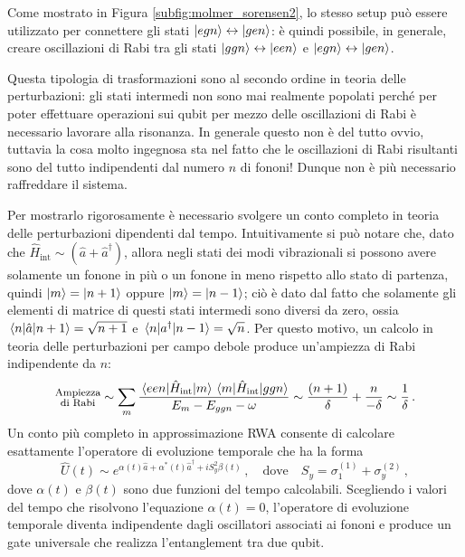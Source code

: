 \noindent Come mostrato in Figura \ref{subfig:molmer_sorensen2}, lo stesso setup può essere utilizzato per connettere gli stati $\ket{egn} \leftrightarrow \ket{gen}$: è quindi possibile, in generale, creare oscillazioni di Rabi tra gli stati $\ket{ggn} \leftrightarrow \ket{een}$ e $\ket{egn} \leftrightarrow \ket{gen}$. 

\noindent Questa tipologia di trasformazioni sono al secondo ordine in teoria delle perturbazioni: gli stati intermedi non sono mai realmente popolati perché per poter effettuare operazioni sui qubit per mezzo delle oscillazioni di Rabi è necessario lavorare alla risonanza. In generale questo non è del tutto ovvio, tuttavia la cosa molto ingegnosa sta nel fatto che le oscillazioni di Rabi risultanti sono del tutto indipendenti dal numero $n$ di fononi! Dunque non è più necessario raffreddare il sistema. 

\noindent Per mostrarlo rigorosamente è necessario svolgere un conto completo in teoria delle perturbazioni dipendenti dal tempo. Intuitivamente si può notare che, dato che $\hat{H}_{\text{int}} \sim (\hat{a} + \hat{a}^\dag)$, allora negli stati dei modi vibrazionali si possono avere solamente un fonone in più o un fonone in meno rispetto allo stato di partenza, quindi $\ket{m} = \ket{n+1}$ oppure $\ket{m} = \ket{n-1}$; ciò è dato dal fatto che solamente gli elementi di matrice di questi stati intermedi sono diversi da zero, ossia $\mel{n}{\hat{a}}{n+1} = \sqrt{n+1}$ e $\mel{n}{a^\dag}{n-1} = \sqrt{n}$. Per questo motivo, un calcolo in teoria delle perturbazioni per campo debole produce  un'ampiezza di Rabi  indipendente da $n$:
\begin{equation*}
    \begin{large}\substack{\text{Ampiezza} \\
    \text{di Rabi}}\end{large} \sim \sum_m \frac{\mel{een}{\hat{H}_{\text{int}}}{m} \mel{m}{\hat{H}_{\text{int}}}{ggn}}{E_m - E_{ggn} - \omega} \sim \frac{(n+1)}{\delta} + \frac{n}{-\delta} \sim \frac{1}{\delta} \, .
\end{equation*}
Un conto pi\`u completo  in approssimazione RWA consente di calcolare esattamente l'operatore di evoluzione temporale che ha la forma
\begin{equation*}
    \hat{U}(t) \sim e^{\alpha(t) \hat{a} + \alpha^\ast(t) \hat{a}^\dag + i S^2_y \beta(t)} \, , \quad \text{dove} \quad S_y = \sigma_1^{(1)} + \sigma_y^{(2)} \, ,
\end{equation*}
dove $\alpha(t)$ e $\beta(t)$ sono due funzioni del tempo calcolabili. Scegliendo i valori del tempo che risolvono l'equazione $\alpha(t) = 0$, l'operatore di evoluzione temporale diventa indipendente dagli oscillatori associati ai fononi e produce un gate universale che realizza l'entanglement tra due qubit.